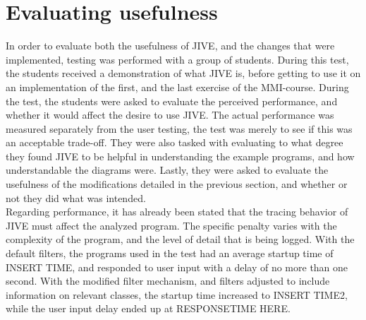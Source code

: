 \section{Evaluating usefulness}\label{jiveEval}
In order to evaluate both the usefulness of JIVE, and the changes that were implemented, testing was performed with a group of students.
During this test, the students received a demonstration of what JIVE is, before getting to use it on an implementation of the first, and the last exercise of the MMI-course.
During the test, the students were asked to evaluate the perceived performance, and whether it would affect the desire to use JIVE.
The actual performance was measured separately from the user testing, the test was merely to see if this was an acceptable trade-off.
They were also tasked with evaluating to what degree they found JIVE to be helpful in understanding the example programs, and how understandable the diagrams were.
Lastly, they were asked to evaluate the usefulness of the modifications detailed in the previous section, and whether or not they did what was intended.
~\\

Regarding performance, it has already been stated that the tracing behavior of JIVE must affect the analyzed program.
The specific penalty varies with the complexity of the program, and the level of detail that is being logged.
With the default filters, the programs used in the test had an average startup time of INSERT TIME, and responded to user input with a delay of no more than one second.
With the modified filter mechanism, and filters adjusted to include information on relevant classes, the startup time increased to INSERT TIME2, while the user input delay ended up at RESPONSETIME HERE.
~\\

